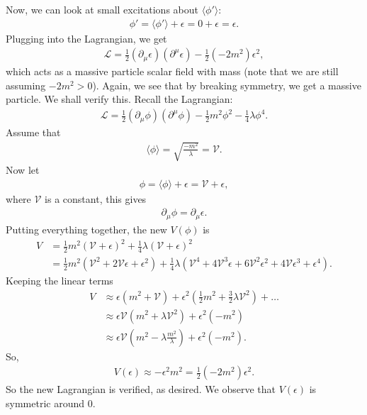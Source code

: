 \documentclass{book}
\numberwithin{equation}{section}
\theoremstyle{definition}
\newcommand{\p}{\partial}
\newcommand{\lag}{\mathcal{L}}
\begin{document}
Now, we can look at small excitations about $\langle \phi' \rangle$:
\begin{align}
\phi' = \langle \phi' \rangle + \epsilon = 0+\epsilon = \epsilon.
\end{align}
Plugging into the Lagrangian, we get
\begin{align}
\lag = \frac{1}{2}(\p_\mu\epsilon)(\p^\mu\epsilon) - \frac{1}{2}(-2m^2)\epsilon^2,
\end{align}
which acts as a massive particle scalar field with mass (note that we are still assuming $-2m^2 > 0$). Again, we see that by breaking symmetry, we get a massive particle. We shall verify this. Recall the Lagrangian:
\begin{align}
\lag = \frac{1}{2}(\p_\mu\phi)(\p^\mu\phi) - \frac{1}{2}m^2\phi^2 - \frac{1}{4}\lambda \phi^4.
\end{align}
Assume that
\begin{align}
\langle \phi \rangle = \sqrt{\frac{-m^2}{\lambda}} = \mathcal{V}.
\end{align}
Now let
\begin{align}
\phi = \langle \phi \rangle + \epsilon = \mathcal{V} + \epsilon,
\end{align}
where $\mathcal{V}$ is a constant, this gives
\begin{align}
\p_\mu \phi = \p_\mu\epsilon.
\end{align}
Putting everything together, the new $V(\phi)$ is
\begin{align}
V &= \frac{1}{2}m^2(\mathcal{V}+\epsilon)^2 + \frac{1}{4}\lambda(\mathcal{V}+\epsilon)^2 \\
&= \frac{1}{2}m^2(\mathcal{V}^2 + 2\mathcal{V}\epsilon + \epsilon^2) + \frac{1}{4}\lambda(\mathcal{V}^4 + 4\mathcal{V}^3\epsilon + 6\mathcal{V}^2\epsilon^2 + 4\mathcal{V}\epsilon^3 + \epsilon^4).
\end{align}
Keeping the linear terms
\begin{align}
V &\approx \epsilon(m^2 + \mathcal{V}) + \epsilon^2\left( \frac{1}{2}m^2 + \frac{3}{2}\lambda \mathcal{V}^2 \right) + \dots\\
&\approx \epsilon\mathcal{V}(m^2 + \lambda \mathcal{V}^2) + \epsilon^2(-m^2)\\
&\approx \epsilon \mathcal{V}\left( m^2 - \lambda \frac{m^2}{\lambda} \right) + \epsilon^2(-m^2).
\end{align}
So,
\begin{align}
V(\epsilon) \approx -\epsilon^2m^2 = \frac{1}{2}(-2m^2)\epsilon^2.
\end{align}
So the new Lagrangian is verified, as desired. We observe that $V(\epsilon)$ is symmetric around 0.\\
\end{document}

